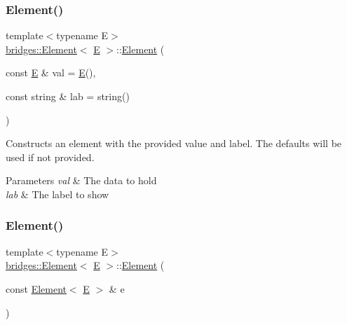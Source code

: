 \subsubsection{\texorpdfstring{Element()}{Element()}\hspace{0.1cm}{\footnotesize\ttfamily [1/2]}}
{\footnotesize\ttfamily template$<$typename E$>$ \\
\mbox{\hyperlink{classbridges_1_1_element}{bridges\+::\+Element}}$<$ \mbox{\hyperlink{namespacebridges_acfb0a4f7877d8f63de3e6862004c50eda3a3ea00cfc35332cedf6e5e9a32e94da}{E}} $>$\+::\mbox{\hyperlink{classbridges_1_1_element}{Element}} (\begin{DoxyParamCaption}\item[{const \mbox{\hyperlink{namespacebridges_acfb0a4f7877d8f63de3e6862004c50eda3a3ea00cfc35332cedf6e5e9a32e94da}{E}} \&}]{val = {\ttfamily \mbox{\hyperlink{namespacebridges_acfb0a4f7877d8f63de3e6862004c50eda3a3ea00cfc35332cedf6e5e9a32e94da}{E}}()},  }\item[{const string \&}]{lab = {\ttfamily string()} }\end{DoxyParamCaption})\hspace{0.3cm}{\ttfamily [inline]}}

Constructs an element with the provided value and label. The defaults will be used if not provided.


\begin{DoxyParams}{Parameters}
{\em val} & The data to hold \\
\hline
{\em lab} & The label to show \\
\hline
\end{DoxyParams}
\mbox{\label{classbridges_1_1_element_a6dc69b51f85f4e9914434b8c79126057}} 
\subsubsection{\texorpdfstring{Element()}{Element()}\hspace{0.1cm}{\footnotesize\ttfamily [2/2]}}
{\footnotesize\ttfamily template$<$typename E$>$ \\
\mbox{\hyperlink{classbridges_1_1_element}{bridges\+::\+Element}}$<$ \mbox{\hyperlink{namespacebridges_acfb0a4f7877d8f63de3e6862004c50eda3a3ea00cfc35332cedf6e5e9a32e94da}{E}} $>$\+::\mbox{\hyperlink{classbridges_1_1_element}{Element}} (\begin{DoxyParamCaption}\item[{const \mbox{\hyperlink{classbridges_1_1_element}{Element}}$<$ \mbox{\hyperlink{namespacebridges_acfb0a4f7877d8f63de3e6862004c50eda3a3ea00cfc35332cedf6e5e9a32e94da}{E}} $>$ \&}]{e }\end{DoxyParamCaption})\hspace{0.3cm}{\ttfamily [inline]}}

